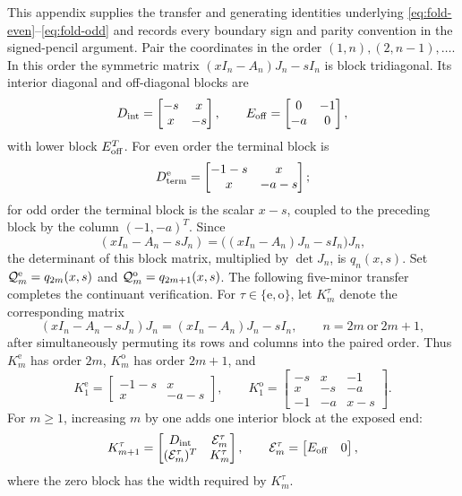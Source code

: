 \documentclass[a4paper,preprint,12pt,nopreprintline,sort&compress]{elsarticle}
\numberwithin{equation}{section}
\theoremstyle{remark}
\begin{document}
This appendix supplies the transfer and generating identities underlying
\eqref{eq:fold-even}--\eqref{eq:fold-odd} and records every boundary sign
and parity convention in the signed-pencil argument.
Pair the coordinates in the order
\((1,n),(2,n-1),\ldots\).  In this order the symmetric matrix
\((xI_n-A_n)J_n-sI_n\) is block tridiagonal.  Its interior diagonal and
off-diagonal blocks are
\[
 D_{\rm int}=\begin{bmatrix}-s&x\\x&-s\end{bmatrix},
 \qquad
 E_{\rm off}=\begin{bmatrix}0&-1\\-a&0\end{bmatrix},
\]
with lower block \(E_{\rm off}^T\).  For even order the terminal block is
\[
 D_{\rm term}^{\rm e}=\begin{bmatrix}-1-s&x\\x&-a-s\end{bmatrix};
\]
for odd order the terminal block is the scalar \(x-s\), coupled to the
preceding block by the column \((-1,-a)^T\).  Since
\[
 (xI_n-A_n-sJ_n)=\bigl((xI_n-A_n)J_n-sI_n\bigr)J_n,
\]
the determinant of this block matrix, multiplied by \(\det J_n\), is
\(q_n(x,s)\).  Set \(\mathcal Q_m^{\rm e}=q_{2m}(x,s)\) and
\(\mathcal Q_m^{\rm o}=q_{2m+1}(x,s)\).  The following five-minor transfer
completes the continuant verification.
For \(\tau\in\{\mathrm e,\mathrm o\}\), let \(K_m^\tau\) denote the
corresponding matrix
\[
 (xI_n-A_n-sJ_n)J_n=(xI_n-A_n)J_n-sI_n,
 \qquad n=2m\ \text{or}\ 2m+1,
\]
after simultaneously permuting its rows and columns into the paired
order.  Thus \(K_m^{\mathrm e}\) has order \(2m\),
\(K_m^{\mathrm o}\) has order \(2m+1\), and
\[
 K_1^{\mathrm e}=
 \begin{bmatrix}-1-s&x\\x&-a-s\end{bmatrix},
 \qquad
 K_1^{\mathrm o}=
 \begin{bmatrix}
 -s&x&-1\\
 x&-s&-a\\
 -1&-a&x-s
 \end{bmatrix}.
\]
For \(m\geq1\), increasing \(m\) by one adds one interior block at the
exposed end:
\begin{equation}\label{eq:fold-block-extension}
 K_{m+1}^\tau=
 \begin{bmatrix}
  D_{\rm int}&\mathcal E_m^\tau\\
  (\mathcal E_m^\tau)^T&K_m^\tau
 \end{bmatrix},
 \qquad
 \mathcal E_m^\tau=
 \begin{bmatrix}E_{\rm off}&0\end{bmatrix},
\end{equation}
where the zero block has the width required by \(K_m^\tau\).
\end{document}
